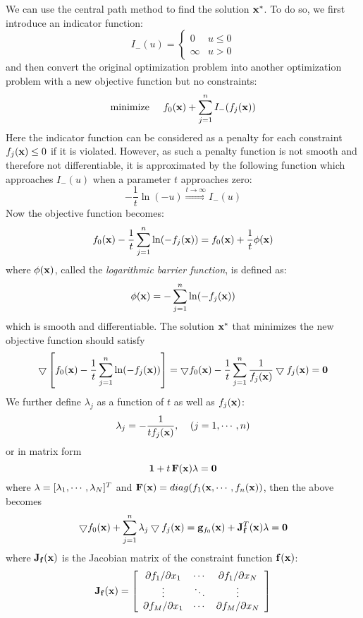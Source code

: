 We can use the central path method to find the solution ${\bf x}^*$. 
To do so, we first introduce an indicator function:
\[
I_-(u)=\left\{\begin{array}{ll}0 & u\le 0\\\infty& u>0\end{array}
\right.
\]
and then convert the original optimization problem into another 
optimization problem with a new objective function but no constraints:
\begin{equation}
  \mbox{minimize} \;\;\;\;\; f_0({\bf x})+\sum_{j=1}^nI_-(f_j({\bf x}))
\end{equation}
Here the indicator function can be considered as a penalty for each
constraint $f_j({\bf x})\le 0$ if it is violated. However, as such a
penalty function is not smooth and therefore not differentiable, it 
is approximated by the following function which approaches $I_-(u)$
when a parameter $t$ approaches zero:
\[
-\frac{1}{t}\ln(-u)\stackrel{t\rightarrow \infty}{\Longrightarrow}I_-(u)
\]
Now the objective function becomes:
\[
f_0({\bf x})-\frac{1}{t}\sum_{j=1}^n \ln(-f_j({\bf x}))
=f_0({\bf x})+\frac{1}{t}\phi({\bf x})
\]
where $\phi({\bf x})$, called the {\em logarithmic barrier function}, is
defined as:
\[
\phi({\bf x})=-\sum_{j=1}^n \ln(-f_j({\bf x}))
\]
which is smooth and differentiable. The solution ${\bf x}^*$ that
minimizes the new objective function should satisfy 
\[
\bigtriangledown \left[ f_0({\bf x})-\frac{1}{t}\sum_{j=1}^n \ln(-f_j({\bf x})) \right]
=\bigtriangledown f_0({\bf x})-\frac{1}{t}\sum_{j=1}^n \frac{1}{f_j({\bf x})}
\bigtriangledown f_j({\bf x})={\bf 0}
\]
We further define $\lambda_j$ as a function of $t$ as well as $f_j({\bf x})$:
\[
\lambda_j=-\frac{1}{t f_j({\bf x})},\;\;\;\;(j=1,\cdots,n)
\]
or in matrix form
\[
{\bf 1}+t\,{\bf F}({\bf x}){\bf\lambda}={\bf 0}
\]
where ${\bf\lambda}=[\lambda_1,\cdots,\lambda_N]^T$ and 
${\bf F}({\bf x})=diag(f_1({\bf x},\cdots,f_n({\bf x}))$, then the above 
becomes
\[
\bigtriangledown f_0({\bf x})+\sum_{j=1}^n \lambda_j\bigtriangledown f_j({\bf x})
={\bf g}_{f_0}({\bf x})+{\bf J}_{\bf f}^T({\bf x}){\bf\lambda}={\bf 0}
\]
where ${\bf J}_{\bf f}({\bf x})$ is the Jacobian matrix of the constraint
function ${\bf f}({\bf x})$:
\[
{\bf J}_{\bf f}({\bf x})=  \left[\begin{array}{ccc}
      \partial f_1/\partial x_1&\cdots&\partial f_1/\partial x_N\\
      \vdots & \ddots & \vdots\\
      \partial f_M/\partial x_1&\cdots&\partial f_M/\partial x_N\end{array}\right]
\]
